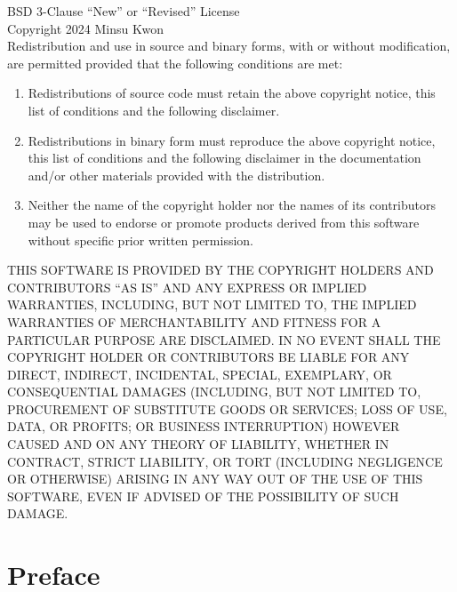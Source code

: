 \documentclass[11pt]{report}
\begin{document}
\begin{center}
\begin{tcolorbox}[enhanced jigsaw, colback=white, colframe=black, boxrule=0.75pt, width=0.8\textwidth, arc=0pt, outer arc=0pt, drop shadow=black]
    BSD 3-Clause ``New'' or ``Revised'' License \\
    Copyright 2024 Minsu Kwon \\
    Redistribution and use in source and binary forms, with or without modification, are permitted provided that the following conditions are met:

    \begin{enumerate}
        \item Redistributions of source code must retain the above copyright notice, this list of conditions and the following disclaimer.
        \item Redistributions in binary form must reproduce the above copyright notice, this list of conditions and the following disclaimer in the documentation and/or other materials provided with the distribution.
        \item Neither the name of the copyright holder nor the names of its contributors may be used to endorse or promote products derived from this software without specific prior written permission.
    \end{enumerate}

    THIS SOFTWARE IS PROVIDED BY THE COPYRIGHT HOLDERS AND CONTRIBUTORS ``AS IS'' AND ANY EXPRESS OR IMPLIED WARRANTIES, INCLUDING, BUT NOT LIMITED TO, THE IMPLIED WARRANTIES OF MERCHANTABILITY AND FITNESS FOR A PARTICULAR PURPOSE ARE DISCLAIMED. IN NO EVENT SHALL THE COPYRIGHT HOLDER OR CONTRIBUTORS BE LIABLE FOR ANY DIRECT, INDIRECT, INCIDENTAL, SPECIAL, EXEMPLARY, OR CONSEQUENTIAL DAMAGES (INCLUDING, BUT NOT LIMITED TO, PROCUREMENT OF SUBSTITUTE GOODS OR SERVICES; LOSS OF USE, DATA, OR PROFITS; OR BUSINESS INTERRUPTION) HOWEVER CAUSED AND ON ANY THEORY OF LIABILITY, WHETHER IN CONTRACT, STRICT LIABILITY, OR TORT (INCLUDING NEGLIGENCE OR OTHERWISE) ARISING IN ANY WAY OUT OF THE USE OF THIS SOFTWARE, EVEN IF ADVISED OF THE POSSIBILITY OF SUCH DAMAGE.
\end{tcolorbox}
\end{center}
\vspace*{\fill}

\newpage
\section*{\centering Preface}
\end{document}
